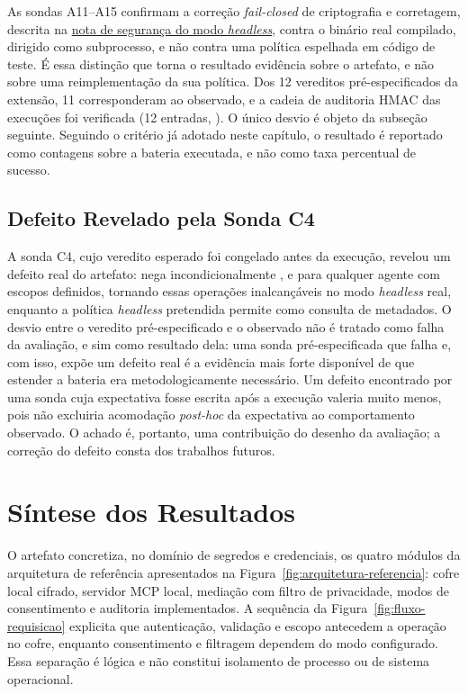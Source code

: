 \documentclass[12pt,openright,twoside,a4paper,english,brazil]{abntex2}
\begin{document}
As sondas A11--A15 confirmam a correção \textit{fail-closed} de criptografia e corretagem, descrita na \hyperref[nota:headless]{nota de segurança do modo \textit{headless}}, contra o binário real compilado, dirigido como subprocesso, e não contra uma política espelhada em código de teste. É essa distinção que torna o resultado evidência sobre o artefato, e não sobre uma reimplementação da sua política. Dos 12 vereditos pré-especificados da extensão, 11 corresponderam ao observado, e a cadeia de auditoria HMAC das execuções foi verificada (12 entradas, ). O único desvio é objeto da subseção seguinte. Seguindo o critério já adotado neste capítulo, o resultado é reportado como contagens sobre a bateria executada, e não como taxa percentual de sucesso.

\subsection{Defeito Revelado pela Sonda C4}
\label{sec:defeito-c4}
A sonda C4, cujo veredito esperado foi congelado antes da execução, revelou um defeito real do artefato:  nega incondicionalmente ,  e  para qualquer agente com escopos definidos, tornando essas operações inalcançáveis no modo \textit{headless} real, enquanto a política \textit{headless} pretendida permite  como consulta de metadados. O desvio entre o veredito pré-especificado e o observado não é tratado como falha da avaliação, e sim como resultado dela: uma sonda pré-especificada que falha e, com isso, expõe um defeito real é a evidência mais forte disponível de que estender a bateria era metodologicamente necessário. Um defeito encontrado por uma sonda cuja expectativa fosse escrita após a execução valeria muito menos, pois não excluiria acomodação \textit{post-hoc} da expectativa ao comportamento observado. O achado é, portanto, uma contribuição do desenho da avaliação; a correção do defeito consta dos trabalhos futuros.

\section{Síntese dos Resultados}
O artefato concretiza, no domínio de segredos e credenciais, os quatro módulos da arquitetura de referência apresentados na Figura~\ref{fig:arquitetura-referencia}: cofre local cifrado, servidor MCP local, mediação com filtro de privacidade, modos de consentimento e auditoria implementados. A sequência da Figura~\ref{fig:fluxo-requisicao} explicita que autenticação, validação e escopo antecedem a operação no cofre, enquanto consentimento e filtragem dependem do modo configurado. Essa separação é lógica e não constitui isolamento de processo ou de sistema operacional.
\end{document}

